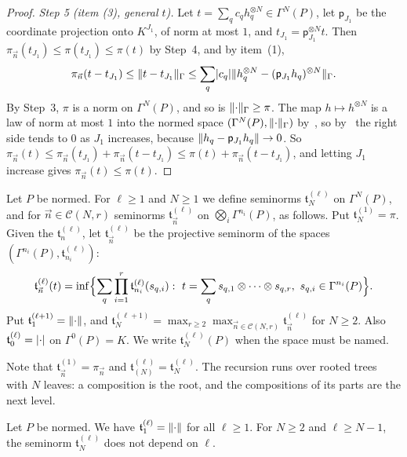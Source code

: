 \begin{proof}
\emph{Step 5 (item (3), general $t$).} Let $t=\sum_qc_qh_q^{\otimes N}\in\Gamma^N(P)$, let $\mathsf p_{J_1}$ be the coordinate projection onto $K^{J_1}$, of norm at most $1$, and $t_{J_1}=\mathsf p_{J_1}^{\otimes N}t$. Then $\pi_{\vec n}(t_{J_1})\le\pi(t_{J_1})\le\pi(t)$ by Step~4, and by item~(1),
\[
 \pi_{\vec n}(t-t_{J_1})\le\lVert t-t_{J_1}\rVert_\Gamma\le\sum_q\lvert c_q\rvert\lVert h_q^{\otimes N}-(\mathsf p_{J_1}h_q)^{\otimes N}\rVert_\Gamma.
\]
By Step~3, $\pi$ is a norm on $\Gamma^N(P)$, and so is $\lVert \cdot\rVert_\Gamma\ge\pi$. The map $h\mapsto h^{\otimes N}$ is a law of norm at most $1$ into the normed space $(\Gamma^N(P),\lVert \cdot\rVert_\Gamma)$ by~\cite[Lemma~Q.1(2)]{I}, so by~\cite[(Q.3)]{I} the right side tends to $0$ as $J_1$ increases, because $\lVert h_q-\mathsf p_{J_1}h_q\rVert\to0$. So $\pi_{\vec n}(t)\le\pi_{\vec n}(t_{J_1})+\pi_{\vec n}(t-t_{J_1})\le\pi(t)+\pi_{\vec n}(t-t_{J_1})$, and letting $J_1$ increase gives $\pi_{\vec n}(t)\le\pi(t)$.
\end{proof}

\begin{definition}\label{dp:def:tree}
Let $P$ be normed. For $\ell\ge1$ and $N\ge1$ we define seminorms $\mathfrak t^{(\ell)}_N$ on $\Gamma^N(P)$, and for $\vec n\in\mathcal C(N,r)$ seminorms $\mathfrak t^{(\ell)}_{\vec n}$ on $\bigotimes_i\Gamma^{n_i}(P)$, as follows. Put $\mathfrak t^{(1)}_N=\pi$. Given the $\mathfrak t^{(\ell)}_n$, let $\mathfrak t^{(\ell)}_{\vec n}$ be the projective seminorm of the spaces $(\Gamma^{n_i}(P),\mathfrak t^{(\ell)}_{n_i})$:
\begin{equation}\label{dp:eq:tree-root}
 \mathfrak t^{(\ell)}_{\vec n}(t)=\inf\Bigl\{\sum_q\prod_{i=1}^r\mathfrak t^{(\ell)}_{n_i}(s_{q,i}):\ t=\sum_qs_{q,1}\otimes\dots\otimes s_{q,r},\ s_{q,i}\in\Gamma^{n_i}(P)\Bigr\}.
\end{equation}
Put $\mathfrak t^{(\ell+1)}_1=\lVert \cdot\rVert$, and $\mathfrak t^{(\ell+1)}_N=\max_{r\ge2}\max_{\vec n\in\mathcal C(N,r)}\mathfrak t^{(\ell)}_{\vec n}$ for $N\ge2$. Also $\mathfrak t^{(\ell)}_0=\lvert \cdot\rvert$ on $\Gamma^0(P)=K$. We write $\mathfrak t^{(\ell)}_N(P)$ when the space must be named.
\end{definition}

Note that $\mathfrak t^{(1)}_{\vec n}=\pi_{\vec n}$ and $\mathfrak t^{(\ell)}_{(N)}=\mathfrak t^{(\ell)}_N$. The recursion runs over rooted trees with $N$ leaves: a composition is the root, and the compositions of its parts are the next level.

\begin{lemma}[stabilization]\label{dp:lem:tree-stable}
Let $P$ be normed. We have $\mathfrak t^{(\ell)}_1=\lVert \cdot\rVert$ for all $\ell\ge1$. For $N\ge2$ and $\ell\ge N-1$, the seminorm $\mathfrak t^{(\ell)}_N$ does not depend on $\ell$.
\end{lemma}

